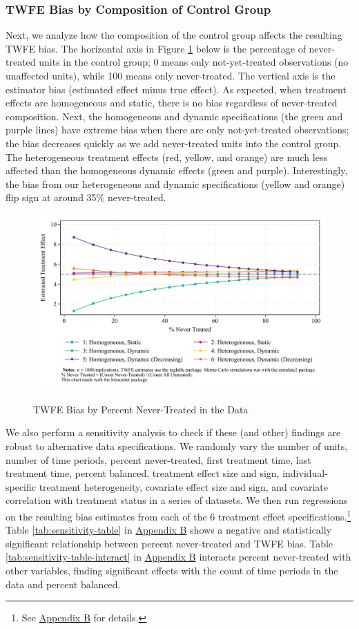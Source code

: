 \documentclass[12pt]{article}
\begin{document}
\subsubsection{TWFE Bias by Composition of Control Group}
Next, we analyze how the composition of the control group affects the resulting TWFE bias. The horizontal axis in Figure \ref{fig:pc-nevertreat} below is the percentage of never-treated units in the control group; 0 means only not-yet-treated observations (no unaffected units), while 100 means only never-treated. The vertical axis is the  estimator bias (estimated effect minus true effect). As expected, when treatment effects are homogeneous and static, there is no bias regardless of never-treated composition. Next, the homogeneous and dynamic specifications (the green and purple lines) have extreme bias when there are only not-yet-treated observations; the bias decreases quickly as we add never-treated units into the control group. The heterogeneous treatment effects (red, yellow, and orange) are much less affected than the homogeneous dynamic effects (green and purple). Interestingly, the bias from our heterogeneous and dynamic specifications (yellow and orange) flip sign at around 35\% never-treated.
\begin{figure}[H]
    \centering
    \caption{TWFE Bias by Percent Never-Treated in the Data}
    \includegraphics[width=5in]{Figures/TWFE Bias by Percent Never Treated.jpg}
    \label{fig:pc-nevertreat}
\end{figure}
We also perform a sensitivity analysis to check if these (and other) findings are robust to alternative data specifications. We randomly vary the number of units, number of time periods, percent never-treated, first treatment time, last treatment time, percent balanced, treatment effect size and sign, individual-specific treatment heterogeneity, covariate effect size and sign, and covariate correlation with treatment status in a series of datasets. We then run regressions on the resulting bias estimates from each of the 6 treatment effect specifications.\footnote{See \hyperref[sec:appendixb]{Appendix B} for details.} Table \ref{tab:sensitivity-table} in \hyperref[sec:appendixb]{Appendix B} shows a negative and statistically significant relationship between percent never-treated and TWFE bias. Table \ref{tab:sensitivity-table-interact} in \hyperref[sec:appendixb]{Appendix B} interacts percent never-treated with other variables, finding significant effects with the count of time periods in the data and percent balanced.
\end{document}
